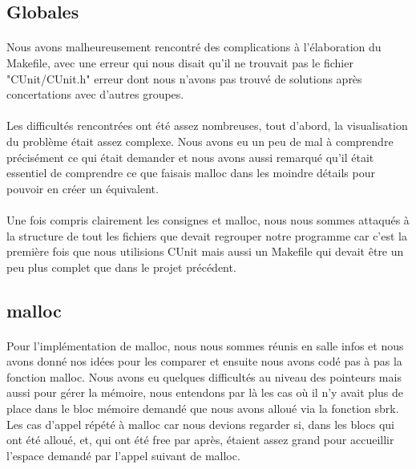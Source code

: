 \documentclass[10pt,a4paper]{article}
\begin{document}
\subsection{Globales}

\paragraph{}Nous avons malheureusement rencontré des complications à l'élaboration du Makefile, avec une erreur qui nous disait qu'il ne trouvait pas le fichier "CUnit/CUnit.h" erreur dont nous n'avons pas trouvé de solutions après concertations avec d'autres groupes.

\paragraph{}Les difficultés rencontrées ont été assez nombreuses, tout d'abord, la visualisation du problème était assez complexe. Nous avons eu un peu de mal à comprendre précisément ce qui était demander et nous avons aussi remarqué qu'il était essentiel de comprendre ce que faisais malloc dans les moindre détails pour pouvoir en créer un équivalent.

\paragraph{}Une fois compris clairement les consignes et malloc, nous nous sommes attaqués à la structure de tout les fichiers que devait regrouper notre programme car c'est la première fois que nous utilisions CUnit mais aussi un Makefile qui devait être un peu plus complet que dans le projet précédent.

\subsection{malloc}

\paragraph{}Pour l'implémentation de malloc, nous nous sommes réunis en salle infos et nous avons donné nos idées pour les comparer et ensuite nous avons codé pas à pas la fonction malloc. Nous avons eu quelques difficultés au niveau des pointeurs mais aussi pour gérer la mémoire, nous entendons par là les cas où il n'y avait plus de place dans le bloc mémoire demandé que nous avons alloué via la fonction sbrk. Les cas d'appel répété à malloc car nous devions regarder si, dans les blocs qui ont été alloué, et, qui ont été free par après, étaient assez grand pour accueillir l'espace demandé par l'appel suivant de malloc.
\end{document}
